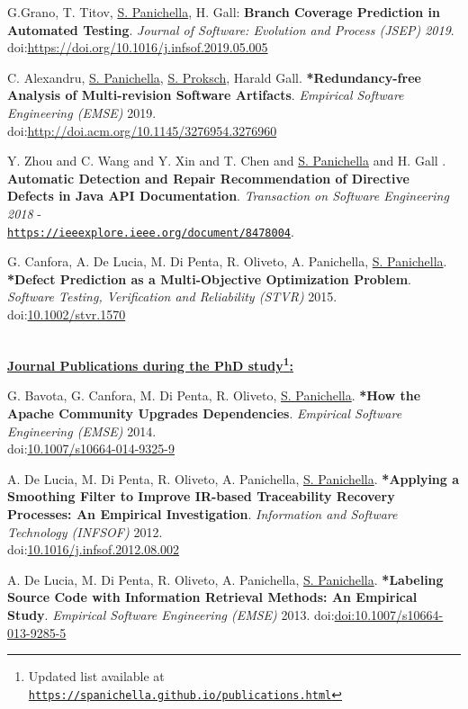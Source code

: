 \documentclass[10pt]{article}
\newcommand\doilink[1]{\href{http://dx.doi.org/#1}{#1}}
\newcommand\doi[1]{doi:\doilink{#1}}
\providecommand*\url[1]{\href{#1}{#1}}
\renewcommand*\url[1]{\href{#1}{\texttt{#1}}}
\begin{document}
\begin{bibenum}
\item \label{J02} G.Grano, T. Titov, \underline{S. Panichella}, H. Gall: \textbf{Branch Coverage Prediction in Automated Testing}.  \emph{Journal of Software: Evolution and Process (JSEP) 2019}. \\ \doi{https://doi.org/10.1016/j.infsof.2019.05.005}\\

\item \label{J0} C. Alexandru,  \underline{S. Panichella}, \underline{S. Proksch}, Harald Gall. \textbf{*Redundancy-free Analysis of Multi-revision Software Artifacts}. \emph{Empirical Software Engineering (EMSE)} 2019.\\
    \doi{http://doi.acm.org/10.1145/3276954.3276960}\\
      \item \label{J01}  Y. Zhou and 
   C. Wang and Y. Xin and T. Chen and \underline{S. Panichella} and H. Gall . \textbf{Automatic Detection and Repair Recommendation of Directive Defects in Java API Documentation}.  \emph{Transaction on Software Engineering 2018} - \\\url{https://ieeexplore.ieee.org/document/8478004}.

\item \label{J1} G. Canfora, A. De Lucia, M. Di Penta, R. Oliveto, A. Panichella, \underline{S. Panichella}. \textbf{*Defect Prediction as a Multi-Objective Optimization Problem}. \emph{Software Testing, Verification and Reliability (STVR)} 2015.\\
    \doi{10.1002/stvr.1570}\\
  \end{bibenum}
  
  \textbf{\\\underline{Journal Publications during the PhD study\footnote{Updated list available at \url{https://spanichella.github.io/publications.html}}:}}\\
  \begin{bibenum}
    \item \label{J2} G. Bavota, G. Canfora, M. Di Penta, R. Oliveto, \underline{S. Panichella}. \textbf{*How the Apache Community Upgrades Dependencies}. \emph{Empirical Software Engineering (EMSE)} 2014.\\
             \doi{10.1007/s10664-014-9325-9}
             
    \item \label{J3}  A. De Lucia, M. Di Penta, R. Oliveto, A. Panichella, \underline{S. Panichella}. \textbf{*Applying a Smoothing Filter to Improve IR-based Traceability Recovery Processes: An Empirical Investigation}. \emph{Information and Software Technology (INFSOF)} 2012.\\
        \doi{10.1016/j.infsof.2012.08.002}

    \item \label{J5} A. De Lucia, M. Di Penta, R. Oliveto, A. Panichella, \underline{S. Panichella}. \textbf{*Labeling Source Code with Information Retrieval Methods: An Empirical Study}. \emph{Empirical Software Engineering (EMSE)} 2013.
                \doi{doi:10.1007/s10664-013-9285-5}
\end{bibenum} 
\end{document}
